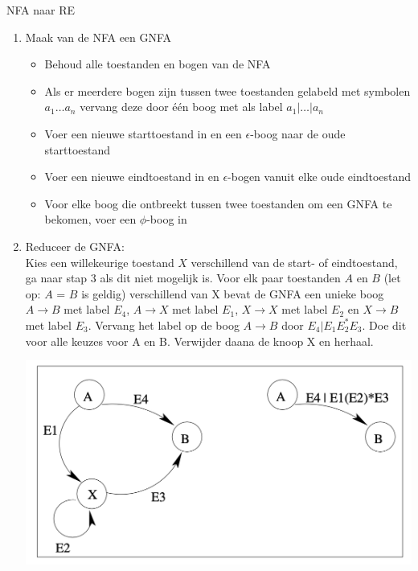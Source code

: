 \begin{alg}[NFA $\to$ RE]{NFA naar RE}
    \begin{enumerate}
        \item Maak van de NFA een GNFA
        \begin{itemize}
            \item Behoud alle toestanden en bogen van de NFA
            \item Als er meerdere bogen zijn tussen twee toestanden gelabeld met symbolen \(a_{1} \ldots a_{n} \) vervang deze door één boog met als label \(a_{1} | \ldots | a_{n} \)
            \item Voer een nieuwe starttoestand in en een \(\epsilon\)-boog naar de oude starttoestand
            \item Voer een nieuwe eindtoestand in en \(\epsilon\)-bogen vanuit elke oude eindtoestand
            \item Voor elke boog die ontbreekt tussen twee toestanden om een GNFA te bekomen, voer een \(\phi\)-boog in
        \end{itemize}
        \item Reduceer de GNFA: \vspace{0.3cm} \\
                Kies een willekeurige toestand \(X\) verschillend van de start- of eindtoestand, ga naar stap 3 als dit niet mogelijk is.
                Voor elk paar toestanden \(A\) en \(B\) (let op: \(A\) = \(B\) is geldig) verschillend van X bevat de GNFA een unieke boog \(A \to B\) met label \(E_{4}\), 
                \(A \to X\) met label \(E_{1}\), \(X \to X\) met label \(E_{2}\) en \(X \to B\) met label \(E_{3}\). Vervang het label op de boog \(A \to B\) door \(E_{4} | E_{1}E_{2}^{*}E_{3}\).
                Doe dit voor alle keuzes voor A en B. Verwijder daana de knoop X en herhaal.
                \begin{center}
                    \includegraphics[scale = 0.375]{Images/GNFAToestandVerwijderen}

\end{center}
\end{enumerate}
\end{alg}
